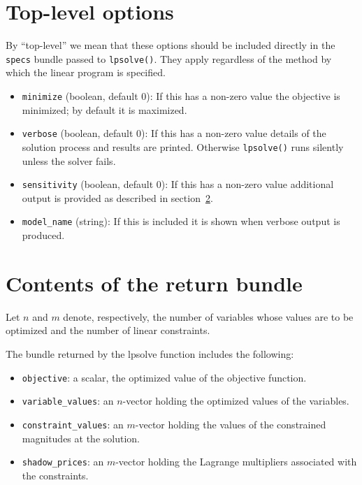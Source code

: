 \documentclass{article}
\begin{document}
\section{Top-level options}
\label{sec:gen-opts}

By ``top-level'' we mean that these options should be included
directly in the \texttt{specs} bundle passed to
\texttt{lpsolve()}. They apply regardless of the method by which the
linear program is specified.

\begin{itemize}
\item \texttt{minimize} (boolean, default 0): If this has a non-zero
  value the objective is minimized; by default it is maximized.  
\item \texttt{verbose} (boolean, default 0): If this has a non-zero
  value details of the solution process and results are
  printed. Otherwise \texttt{lpsolve()} runs silently unless the
  solver fails.
\item \texttt{sensitivity} (boolean, default 0): If this has a
  non-zero value additional output is provided as described in
  section~\ref{sec:retval}.
\item \texttt{model\_name} (string): If this is included it is shown
  when verbose output is produced.
\end{itemize}

\section{Contents of the return bundle}
\label{sec:retval}

Let $n$ and $m$ denote, respectively, the number of variables whose
values are to be optimized and the number of linear constraints.

The bundle returned by the \textsf{lpsolve} function includes the
following:
\begin{itemize}
\item \texttt{objective}: a scalar, the optimized value of the objective
  function.
\item \texttt{variable\_values}: an $n$-vector holding the optimized
  values of the variables.
\item \texttt{constraint\_values}: an $m$-vector holding the values of
  the constrained magnitudes at the solution.
\item \texttt{shadow\_prices}: an $m$-vector holding the Lagrange
  multipliers associated with the constraints.
\end{itemize}
\end{document}
